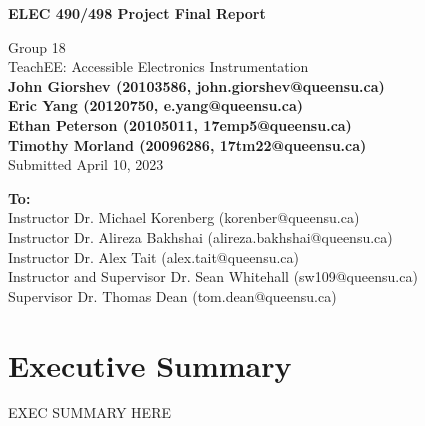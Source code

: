 \documentclass[letterpaper,12pt]{article}
\begin{document}
\begin{titlepage}
    \begin{center}
        \vspace*{1cm}

        \Large
        \textbf{ELEC 490/498 Project Final Report}

        \vspace{0.5cm}
        Group 18\\
        TeachEE: Accessible Electronics Instrumentation\\
        \vspace{0.5cm}
        \normalsize
        \textbf{John Giorshev (20103586, john.giorshev@queensu.ca) \\ Eric Yang (20120750, e.yang@queensu.ca) \\ Ethan Peterson (20105011, 17emp5@queensu.ca) \\ Timothy Morland (20096286, 17tm22@queensu.ca)}\\
        \vspace{0.5cm}
        Submitted April 10, 2023\\

        \vfill
            
        \textbf{To:}\\
        Instructor Dr. Michael Korenberg (korenber@queensu.ca) \\
        Instructor Dr. Alireza Bakhshai (alireza.bakhshai@queensu.ca) \\
        Instructor Dr. Alex Tait (alex.tait@queensu.ca) \\
        Instructor and Supervisor Dr. Sean Whitehall (sw109@queensu.ca) \\
        Supervisor Dr. Thomas Dean (tom.dean@queensu.ca) \\
            
        \vspace{1.8cm}

    \end{center}
\end{titlepage}
\section*{Executive Summary}
EXEC SUMMARY HERE

\newpage

\tableofcontents
\listoffigures
\listoftables
\newpage
\end{document}
